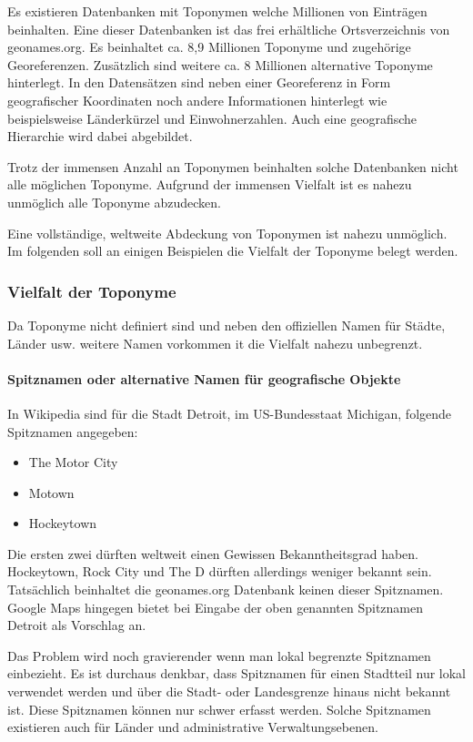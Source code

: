 			Es existieren Datenbanken mit Toponymen welche Millionen von Einträgen beinhalten.
			Eine dieser Datenbanken ist das frei erhältliche Ortsverzeichnis von geonames.org.
			Es beinhaltet ca. 8,9 Millionen Toponyme und zugehörige Georeferenzen.
			Zusätzlich sind weitere ca. 8 Millionen alternative Toponyme hinterlegt.
			In den Datensätzen sind neben einer Georeferenz in Form geografischer Koordinaten noch andere Informationen hinterlegt wie beispielsweise Länderkürzel und Einwohnerzahlen. 
			Auch eine geografische Hierarchie wird dabei abgebildet.

			Trotz der immensen Anzahl an Toponymen beinhalten solche Datenbanken nicht alle möglichen Toponyme.
			Aufgrund der immensen Vielfalt ist es nahezu unmöglich alle Toponyme abzudecken. 

			Eine vollständige, weltweite Abdeckung von Toponymen ist nahezu unmöglich.
			Im folgenden soll an einigen Beispielen die Vielfalt der Toponyme belegt werden.

			\subsubsection*{Vielfalt der Toponyme} 

				Da Toponyme nicht definiert sind und neben den offiziellen Namen für Städte, Länder usw. weitere Namen vorkommen it die Vielfalt nahezu unbegrenzt.
				
				\paragraph{Spitznamen oder alternative Namen für geografische Objekte} 
					In Wikipedia sind für die Stadt Detroit, im US-Bundesstaat Michigan, folgende Spitznamen angegeben:
					
					\begin{itemize}
						\item The Motor City
						\item Motown
						\item Hockeytown
					\end{itemize}

					Die ersten zwei dürften weltweit einen Gewissen Bekanntheitsgrad haben. 
					Hockeytown, Rock City und The D dürften allerdings weniger bekannt sein.
					Tatsächlich beinhaltet die geonames.org Datenbank keinen dieser Spitznamen.
					Google Maps hingegen bietet bei Eingabe der oben genannten Spitznamen Detroit als Vorschlag an.

					Das Problem wird noch gravierender wenn man lokal begrenzte Spitznamen einbezieht.
					Es ist durchaus denkbar, dass Spitznamen für einen Stadtteil nur lokal verwendet werden und über die Stadt- oder Landesgrenze hinaus nicht bekannt ist. 
					Diese Spitznamen können nur schwer erfasst werden.
					Solche Spitznamen existieren auch für Länder und administrative Verwaltungsebenen. 

